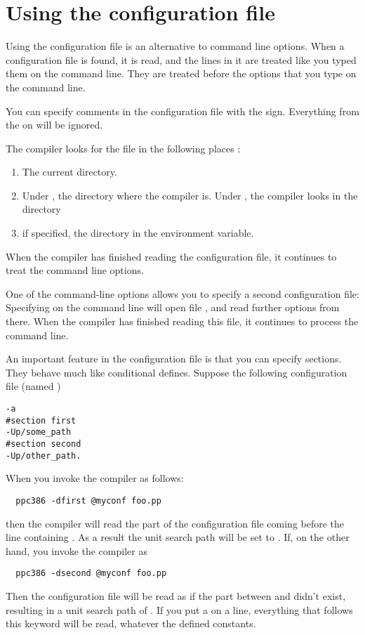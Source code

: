 \documentclass{report}
\begin{document}
\section{Using the configuration file}
\label{se:config_file}
Using the configuration file  is an alternative to command
line options. When a configuration file is found, it is read, and the lines
in it are treated like you typed them on the command line. They are treated
before the options that you type on the command line.

You can specify comments in the configuration file with the \var{\#} sign.
Everything from the \var{\#} on will be ignored.

The compiler looks for the  file in the following places :
\begin{enumerate}
\item The current directory.
\item Under \dos, the directory where the compiler is. Under \linux, 
       the compiler looks in the  directory
\item if specified, the directory in the  environment variable.
\end{enumerate}
When the compiler has finished reading the configuration file, it continues
to treat the command line options.

One of the command-line options allows you to specify a second configuration
file: Specifying  on the command line will open file ,
and read further options from there. When the compiler has finished reading
this file, it continues to process the command line.

An important feature in the configuration file is that you can specify
sections. They behave much like conditional defines. 
Suppose the following configuration file (named )
\begin{verbatim}
-a
#section first
-Up/some_path
#section second
-Up/other_path.
\end{verbatim}
When you invoke the compiler as follows:
\begin{verbatim}
  ppc386 -dfirst @myconf foo.pp
\end{verbatim}
then the compiler will read the part of the configuration file coming before
the line containing . As a result the unit search path will be set
to .
If, on the other hand, you invoke the compiler as 
\begin{verbatim}
  ppc386 -dsecond @myconf foo.pp
\end{verbatim}
Then the configuration file will be read as if the part between
 and  didn't exist, resulting
in a unit search path of .
If you put a  on a line, everything that follows this
keyword will be read, whatever the defined constants.
\end{document}
